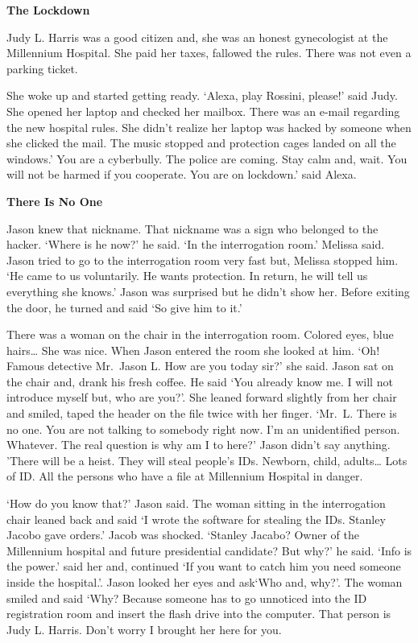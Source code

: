\documentclass[]{book}
\begin{document}
\textbf{The Lockdown}

Judy L. Harris was a good citizen and, she was an honest gynecologist at the Millennium Hospital. She paid her taxes, fallowed the rules. There was not even a parking ticket.

She woke up and started getting ready. `Alexa, play Rossini, please!' said Judy. She opened her laptop and checked her mailbox. There was an e-mail regarding the new hospital rules. She didn't realize her laptop was hacked by someone when she clicked the mail. The music stopped and protection cages landed on all the windows.' You are a cyberbully. The police are coming. Stay calm and, wait. You will not be harmed if you cooperate. You are on lockdown.' said Alexa.

\textbf{There Is No One}

Jason knew that nickname. That nickname was a sign who belonged to the hacker. `Where is he now?' he said. `In the interrogation room.' Melissa said. Jason tried to go to the interrogation room very fast but, Melissa stopped him. `He came to us voluntarily. He wants protection. In return, he will tell us everything she knows.' Jason was surprised but he didn't show her. Before exiting the door, he turned and said `So give him to it.'

There was a woman on the chair in the interrogation room. Colored eyes, blue hairs\ldots{} She was nice. When Jason entered the room she looked at him. `Oh! Famous detective Mr.~Jason L. How are you today sir?' she said. Jason sat on the chair and, drank his fresh coffee. He said `You already know me. I will not introduce myself but, who are you?'. She leaned forward slightly from her chair and smiled, taped the header on the file twice with her finger. `Mr.~L. There is no one. You are not talking to somebody right now. I'm an unidentified person. Whatever. The real question is why am I to here?' Jason didn't say anything. 'There will be a heist. They will steal people's IDs. Newborn, child, adults\ldots{} Lots of ID. All the persons who have a file at Millennium Hospital in danger.

`How do you know that?' Jason said. The woman sitting in the interrogation chair leaned back and said `I wrote the software for stealing the IDs. Stanley Jacobo gave orders.' Jacob was shocked. `Stanley Jacabo? Owner of the Millennium hospital and future presidential candidate? But why?' he said. `Info is the power.' said her and, continued `If you want to catch him you need someone inside the hospital.'. Jason looked her eyes and ask`Who and, why?'. The woman smiled and said `Why? Because someone has to go unnoticed into the ID registration room and insert the flash drive into the computer. That person is Judy L. Harris. Don't worry I brought her here for you.
\end{document}
